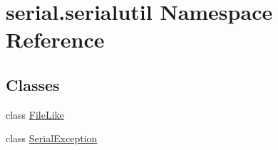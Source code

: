 \hypertarget{namespaceserial_1_1serialutil}{}\section{serial.\+serialutil Namespace Reference}
\label{namespaceserial_1_1serialutil}
\subsection*{Classes}
\begin{DoxyCompactItemize}
\item 
class \hyperlink{classserial_1_1serialutil_1_1_file_like}{File\+Like}
\item 
class \hyperlink{classserial_1_1serialutil_1_1_serial_exception}{Serial\+Exception}
\end{DoxyCompactItemize}
